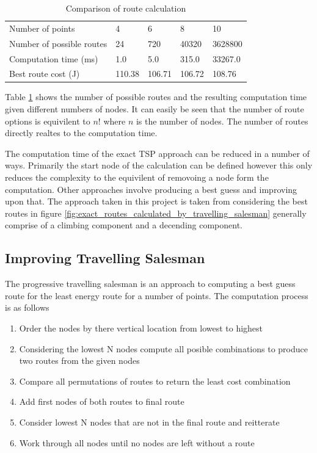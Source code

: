 \documentclass[a4paper,12pt,twoside]{article}
\begin{document}
\begin{table}[width=\textwidth]
\centering
    \begin{tabular}{lllll}
    Number of points	& 4	& 6	& 8	& 10	\\
Number of possible routes	& 24	& 720	& 40320	& 3628800	\\
Computation time (ms)	& 1.0	& 5.0	& 315.0	& 33267.0	\\
Best route cost (J)	& 110.38	& 106.71	& 106.72	& 108.76	\\

    \end{tabular}
\caption{Comparison of route calculation}
\label{tbl:comparison_of_route_calculation}
\end{table}

Table \ref{tbl:comparison_of_route_calculation} shows the number of possible routes and the resulting computation time given different numbers of nodes. It can easily be seen that the number of route options is equivilent to $n!$ where $n$ is the number of nodes. The number of routes directly realtes to the computation time.

The computation time of the exact TSP approach can be reduced in a number of ways. Primarily the start node of the calculation can be defined however this only reduces the complexity to the equivilent of removoing a node form the computation. Other approaches involve producing a best guess and improving upon that. The approach taken in this project is taken from considering the best routes in figure \ref{fig:exact_routes_calculated_by_travelling_salesman} generally comprise of a climbing component and a decending component.

\subsection{Improving Travelling Salesman}
\label{sec:improving_travelling_salesman}

The progressive travelling salesman is an approach to computing a best guess route for the least energy route for a number of points. The computation process is as follows

\begin{enumerate}
\item Order the nodes by there vertical location from lowest to highest
\item Considering the lowest N nodes compute all posible combinations to produce two routes from the given nodes
\item Compare all permutations of routes to return the least cost combination
\item Add first nodes of both routes to final route
\item Consider lowest N nodes that are not in the final route and reitterate
\item Work through all nodes until no nodes are left without a route

\end{enumerate}
\end{document}

